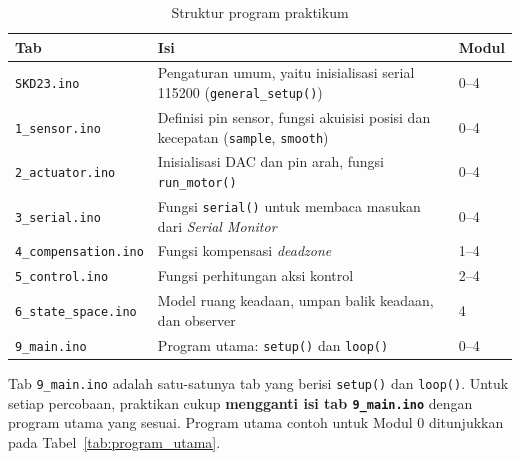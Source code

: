 \documentclass[11pt,a4paper]{article}
\newcommand{\sketch}{\texttt{SKD23.ino}}
\newcommand{\prog}[1]{\texttt{#1}}
\begin{document}
\begin{table}[H]
	\centering
	\caption{Struktur program praktikum}
	\label{tab:struktur_program}
	\begin{tabularx}{\textwidth}{|l|X|l|}
		\hline
		\textbf{Tab}                 & \textbf{Isi}                                                                             & \textbf{Modul} \\
		\hline
		\sketch                      & Pengaturan umum, yaitu inisialisasi serial 115200 (\texttt{general\_setup()})            & 0--4           \\
		\prog{1\_sensor.ino}         & Definisi pin sensor, fungsi akuisisi posisi dan kecepatan (\texttt{sample}, \texttt{smooth}) & 0--4       \\
		\prog{2\_actuator.ino}       & Inisialisasi DAC dan pin arah, fungsi \texttt{run\_motor()}                              & 0--4           \\
		\prog{3\_serial.ino}         & Fungsi \texttt{serial()} untuk membaca masukan dari \textit{Serial Monitor}               & 0--4           \\
		\prog{4\_compensation.ino}   & Fungsi kompensasi \textit{deadzone}                                                      & 1--4           \\
		\prog{5\_control.ino}        & Fungsi perhitungan aksi kontrol                                                           & 2--4           \\
		\prog{6\_state\_space.ino}   & Model ruang keadaan, umpan balik keadaan, dan observer                                    & 4              \\
		\prog{9\_main.ino}           & Program utama: \texttt{setup()} dan \texttt{loop()}                                       & 0--4           \\
		\hline
	\end{tabularx}
\end{table}

Tab \prog{9\_main.ino} adalah satu-satunya tab yang berisi \texttt{setup()} dan \texttt{loop()}. Untuk setiap percobaan, praktikan cukup \textbf{mengganti isi tab \prog{9\_main.ino}} dengan program utama yang sesuai. Program utama contoh untuk Modul 0 ditunjukkan pada Tabel~\ref{tab:program_utama}.
\end{document}
